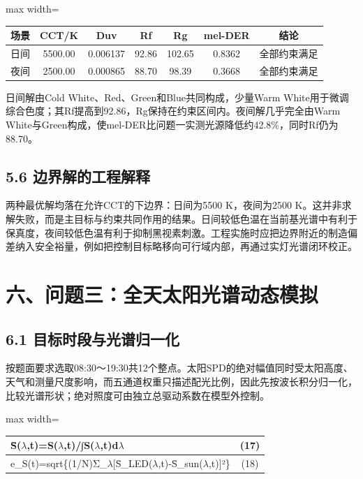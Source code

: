 \documentclass[UTF8,a4paper,12pt]{ctexart}
\begin{document}
\begin{table}[H]
\centering
\small
\begin{adjustbox}{max width=\textwidth}
\begin{tabular}{lcccccc}
\toprule
场景 & CCT/K & Duv & Rf & Rg & mel-DER & 结论 \\
\midrule
日间 & 5500.00 & 0.006137 & 92.86 & 102.65 & 0.8362 & 全部约束满足 \\
夜间 & 2500.00 & 0.000865 & 88.70 & 98.39 & 0.3668 & 全部约束满足 \\
\bottomrule
\end{tabular}
\end{adjustbox}
\end{table}

日间解由Cold White、Red、Green和Blue共同构成，少量Warm White用于微调综合色度；其Rf提高到92.86，Rg保持在约束区间内。夜间解几乎完全由Warm White与Green构成，使mel-DER比问题一实测光源降低约42.8\%，同时Rf仍为88.70。

\subsection{5.6 边界解的工程解释}

两种最优解均落在允许CCT的下边界：日间为5500 K，夜间为2500 K。这并非求解失败，而是主目标与约束共同作用的结果。日间较低色温在当前基光谱中有利于保真度，夜间较低色温有利于抑制黑视素刺激。工程实施时应把边界附近的制造偏差纳入安全裕量，例如把控制目标略移向可行域内部，再通过实灯光谱闭环校正。

\section{六、问题三：全天太阳光谱动态模拟}

\subsection{6.1 目标时段与光谱归一化}

按题面要求选取08:30～19:30共12个整点。太阳SPD的绝对幅值同时受太阳高度、天气和测量尺度影响，而五通道权重只描述配光比例，因此先按波长积分归一化，比较光谱形状；绝对照度可由独立总驱动系数在模型外控制。

\begin{table}[H]
\centering
\small
\begin{adjustbox}{max width=\textwidth}
\begin{tabular}{lc}
\toprule
S̄($\lambda$,t)=S($\lambda$,t)/∫S($\lambda$,t)d$\lambda$ & (17) \\
\midrule
e\_S(t)=sqrt\{(1/N)Σ\_$\lambda$[S̄\_LED($\lambda$,t)-S̄\_sun($\lambda$,t)]²\} & (18) \\
\bottomrule
\end{tabular}
\end{adjustbox}
\end{table}
\end{document}
